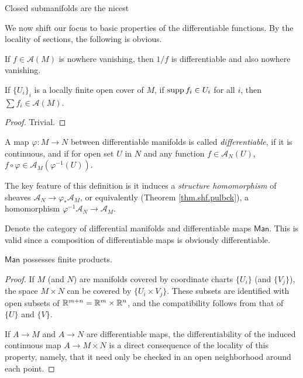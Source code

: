 Closed submanifolds are the nicest 

We now shift our focus to basic properties of the differentiable functions. By the locality of sections, the following is obvious.

\begin{proposition}
    If $f\in\mathcal{A}(M)$ is nowhere vanishing, then $1/f$ is differentiable and also nowhere vanishing.

    If $\{U_i\}_i$ is a locally finite open cover of $M$, if $\operatorname{supp} f_i\in U_i$ for all $i$, then $\sum f_i\in\mathcal{A}(M)$.
\end{proposition}

\begin{proof}
    Trivial.
\end{proof}

\begin{definition}
    A map $\varphi:M\to N$ between differentiable manifolds is called \emph{differentiable}, if it is continuous, and if for open set $U$ in $N$ and any function $f\in\mathcal{A}_N(U)$, $f\circ\varphi\in\mathcal{A}_M(\varphi^{-1}(U))$.

    The key feature of this definition is it induces a \emph{structure homomorphism} of sheaves $\mathcal{A}_N\to \varphi_*\mathcal{A}_M$, or equivalently (Theorem \ref{thm.shf.pulbck}), a homomorphism $\varphi^{-1}\mathcal{A}_N\to\mathcal{A}_M$.

    Denote the category of differential manifolds and differentiable maps $\mathsf{Man}$. This is valid since a composition of differentiable maps is obviously differentiable. 
\end{definition}

\begin{theorem}
    $\mathsf{Man}$ possesses finite products.
\end{theorem}

\begin{proof}
    If $M$ (and $N$) are manifolds covered by coordinate charts $\{U_i\}$ (and $\{V_j\}$), the space $M\times N$ can be covered by $\{U_i\times V_j\}$. These subsets are identified with open subsets of $\mathbb{R}^{m+n}=\mathbb{R}^m\times\mathbb{R}^n$, and the compatibility follows from that of $\{U\}$ and $\{V\}$.

    If $A\to M$ and $A\to N$ are differentiable maps, the differentiability of the induced continuous map $A\to M\times N$ is a direct consequence of the locality of this property, namely, that it need only be checked in an open neighborhood around each point.
\end{proof}

